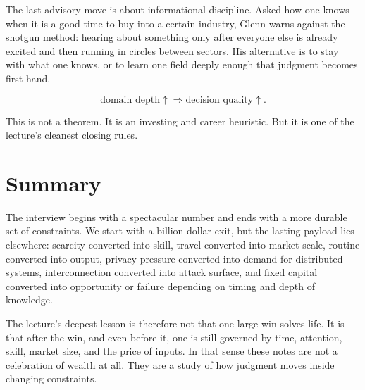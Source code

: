 The last advisory move is about informational discipline. Asked how one knows when it is a good time to buy into a certain industry, Glenn warns against the shotgun method: hearing about something only after everyone else is already excited and then running in circles between sectors. His alternative is to stay with what one knows, or to learn one field deeply enough that judgment becomes first-hand.

\begin{equation}
\text{domain depth}\uparrow \Longrightarrow \text{decision quality}\uparrow.
\end{equation}

This is not a theorem. It is an investing and career heuristic. But it is one of the lecture's cleanest closing rules.

\section{Summary}

The interview begins with a spectacular number and ends with a more durable set of constraints. We start with a billion-dollar exit, but the lasting payload lies elsewhere: scarcity converted into skill, travel converted into market scale, routine converted into output, privacy pressure converted into demand for distributed systems, interconnection converted into attack surface, and fixed capital converted into opportunity or failure depending on timing and depth of knowledge.

The lecture's deepest lesson is therefore not that one large win solves life. It is that after the win, and even before it, one is still governed by time, attention, skill, market size, and the price of inputs. In that sense these notes are not a celebration of wealth at all. They are a study of how judgment moves inside changing constraints.